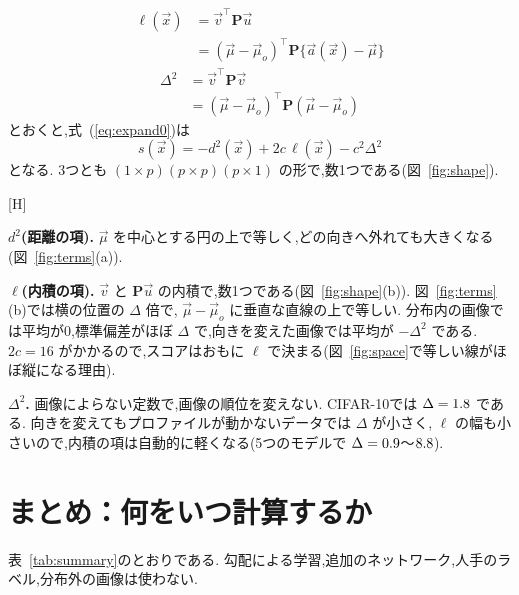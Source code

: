 \documentclass[MIRU,submit,onecolumn]{miru2025j}
\makeatletter
\newcommand{\vmu}{\vec{\mu}}\newcommand{\va}{\vec{a}}\newcommand{\vx}{\vec{x}}\newcommand{\vu}{\vec{u}}\newcommand{\vv}{\vec{v}}
\newcommand{\Pm}{\mathbf{P}}\newcommand{\Sm}{\mathbf{S}}\newcommand{\Id}{\mathbf{I}}\newcommand{\Gm}{\mathbf{G}}
\renewenvironment{figure}{\@floatenv\capwidth\textwidth\ecapwidth\textwidth\abovecaptionskip1mm\belowcaptionskip\z@\@float{figure}}{\end@float}
\renewcommand{\eqref}[1]{(\ref{#1})}
\makeatother
\begin{document}
\begin{equation}
\begin{split}
\ell(\vx)
&=\vv^{\top}\Pm\vu\\
&=(\vmu-\vmu_{o})^{\top}\Pm\{\va(\vx)-\vmu\}
\end{split}
\label{eq:ell}
\end{equation}
\begin{equation}
\begin{split}
\Delta^{2}
&=\vv^{\top}\Pm\vv\\
&=(\vmu-\vmu_{o})^{\top}\Pm(\vmu-\vmu_{o})
\end{split}
\label{eq:delta}
\end{equation}
とおくと,式~\eqref{eq:expand0}は
\begin{equation}
s(\vx)=-d^{2}(\vx)+2c\,\ell(\vx)-c^{2}\Delta^{2}
\label{eq:expand}
\end{equation}
となる. 3つとも $(1\times p)(p\times p)(p\times 1)$ の形で,数1つである(図~\ref{fig:shape}).

\begin{figure}[H]\centering

\caption{式~\eqref{eq:expand}の2つの項(図~\ref{fig:space}と同じ座標と点). (a) $d^{2}$ は $\vmu$ を中心とする円の上で等しい. (b) $\ell$ は $\vmu-\vmu_{o}$ に垂直な直線の上で等しく,横の位置の $\Delta$ 倍である. 下の数直線の山は,分布内(紺)と向きを変えた画像(灰)の $\ell$ の分布の模式図. 紺の丸と赤の点：図~\ref{fig:space}の2枚のテスト画像.}
\label{fig:terms}
\end{figure}

\textbf{$d^{2}$(距離の項).} $\vmu$ を中心とする円の上で等しく,どの向きへ外れても大きくなる(図~\ref{fig:terms}(a)).

\textbf{$\ell$(内積の項).} $\vv$ と $\Pm\vu$ の内積で,数1つである(図~\ref{fig:shape}(b)). 図~\ref{fig:terms}(b)では横の位置の $\Delta$ 倍で, $\vmu-\vmu_{o}$ に垂直な直線の上で等しい. 分布内の画像では平均が0,標準偏差がほぼ $\Delta$ で,向きを変えた画像では平均が $-\Delta^{2}$ である. $2c=16$ がかかるので,スコアはおもに $\ell$ で決まる(図~\ref{fig:space}で等しい線がほぼ縦になる理由).

\textbf{$\Delta^{2}$.} 画像によらない定数で,画像の順位を変えない. CIFAR-10では $\Delta=1.8$ である. 向きを変えてもプロファイルが動かないデータでは $\Delta$ が小さく, $\ell$ の幅も小さいので,内積の項は自動的に軽くなる(5つのモデルで $\Delta=0.9$〜$8.8$).

\section{まとめ：何をいつ計算するか}
表~\ref{tab:summary}のとおりである. 勾配による学習,追加のネットワーク,人手のラベル,分布外の画像は使わない.
\end{document}
